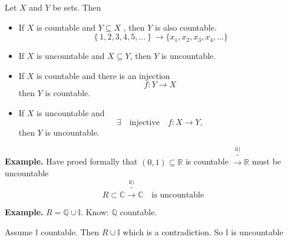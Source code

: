 \documentclass{article}
\theoremstyle{remark}
\begin{document}
\newpage
  \begin{lemma}
    Let $X$ and $Y$ be sets. Then 
    \begin{itemize}
      \item If $X$ is countable and $ Y \subseteq  X$ , then $Y$ is also countable. \[
      \left\{ 1,2,3,4,5, \ldots \right\} \to \{x_{1}, x_{2} , x_{3}, x_{4} , \ldots\} 
      \] 
    \item If $X$ is uncountable and $X \subseteq  Y$, then $Y$ is uncountable. 
    \item If $X$ is countable and there is an injection \[
    f: Y \to X   
    \] 
    then $Y$ is countable.
  \item If $X$ is uncountable and \[
  \exists \quad  \text{injective} \quad  f: X \to Y,   
  \] 
  then $Y$ is uncountable.
    \end{itemize}
  \end{lemma}
   \begin{tcolorbox}
     \textbf{Example.} Have proed formally that $\left( 0,1 \right) \subseteq  \mathbb{R} $ is countable $\overbrace{\to}^\text{ii)}  \mathbb{R} $ must be uncountable \[
       R \subset \mathbb{C}  \overbrace{\longrightarrow}^\text{ii)} \mathbb{C} \quad \text{is uncountable} 
     \] 
   \end{tcolorbox}

   \begin{tcolorbox}
     \textbf{Example.} $R = \mathbb{Q}  \cup \mathbb{I}$. Know: $\mathbb{Q} $ countable.  \par
     Assume $\mathbb{I}$ countable. Then $R \cup \mathbb{I}$ which is a contradiction. So $\mathbb{I}$ is uncountable
   \end{tcolorbox}




\end{document}
